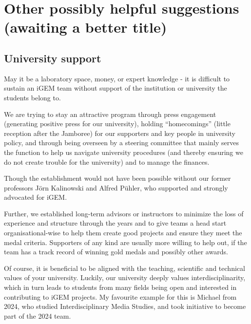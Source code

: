 
\chapter{Other possibly helpful suggestions (awaiting a better title)}\label{ch:other-possibly-helpful-suggestions-(awaiting-a-better-title)}


\section{University support}\label{sec:university-support}
May it be a laboratory space, money, or expert knowledge - it is difficult to sustain an iGEM team without
support of the institution or university the students belong to.

We are trying to stay an attractive program through press engagement (generating positive press for our university),
holding ``homecomings'' (little reception after the Jamboree) for our supporters and key people in university
policy, and through being overseen by a steering committee that mainly serves the function to help us navigate
university procedures (and thereby ensuring we do not create trouble for the university) and to manage the finances.

Though the establishment would not have been possible without our former professors Jörn Kalinowski and Alfred Pühler,
who supported and strongly advocated for iGEM\@.

Further, we established long-term advisors or instructors to minimize the loss of experience and structure through
the years and to give teams a head start organisational-wise to help them create good projects and ensure they meet
the medal criteria.
Supporters of any kind are usually more willing to help out, if the team has a track record of winning gold medals
and possibly other awards.

Of course, it is beneficial to be aligned with the teaching, scientific and technical values of your university.
Luckily, our university deeply values interdisciplinarity, which in turn leads to students from many fields being
open and interested in contributing to iGEM projects.
My favourite example for this is Michael from 2024, who studied Interdisciplinary Media Studies, and took
initiative to become part of the 2024 team.
